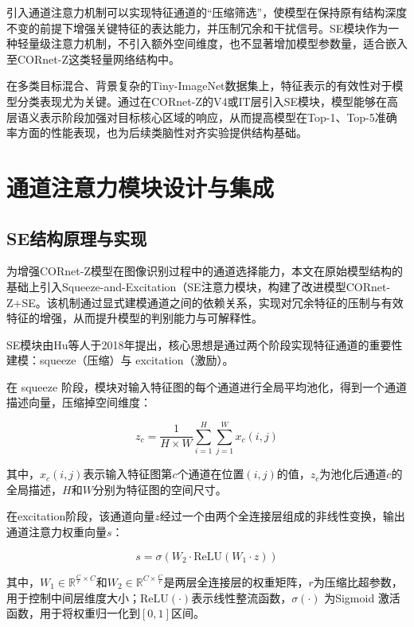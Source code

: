 引入通道注意力机制可以实现特征通道的“压缩筛选”，使模型在保持原有结构深度不变的前提下增强关键特征的表达能力，并压制冗余和干扰信号。SE模块作为一种轻量级注意力机制，不引入额外空间维度，也不显著增加模型参数量，适合嵌入至CORnet-Z这类轻量网络结构中。

在多类目标混合、背景复杂的Tiny-ImageNet数据集上，特征表示的有效性对于模型分类表现尤为关键。通过在CORnet-Z的V4或IT层引入SE模块，模型能够在高层语义表示阶段加强对目标核心区域的响应，从而提高模型在Top-1、Top-5准确率方面的性能表现，也为后续类脑性对齐实验提供结构基础。

\section{通道注意力模块设计与集成}

\subsection{SE结构原理与实现}

为增强CORnet-Z模型在图像识别过程中的通道选择能力，本文在原始模型结构的基础上引入Squeeze-and-Excitation（SE注意力模块，构建了改进模型CORnet-Z+SE。该机制通过显式建模通道之间的依赖关系，实现对冗余特征的压制与有效特征的增强，从而提升模型的判别能力与可解释性。

SE模块由Hu等人于2018年提出，核心思想是通过两个阶段实现特征通道的重要性建模：squeeze（压缩）与 excitation（激励）。

在 squeeze 阶段，模块对输入特征图的每个通道进行全局平均池化，得到一个通道描述向量，压缩掉空间维度：

\begin{equation}
	z_c = 
	\frac{1}{H \times W} 
	\sum_{i=1}^{H} \sum_{j=1}^{W} x_c(i, j)
	\label{eq:se_squeeze}
\end{equation}

其中，$x_c(i,j)$表示输入特征图第$c$个通道在位置$(i,j)$的值，$z_c$为池化后通道$c$的全局描述，$H$和$W$分别为特征图的空间尺寸。

在excitation阶段，该通道向量$z$经过一个由两个全连接层组成的非线性变换，输出通道注意力权重向量$s$：

\begin{equation}
	s = \sigma \left( W_2 \cdot \text{ReLU} \left( W_1 \cdot z \right) \right)
	\label{eq:se_excitation}
\end{equation}

其中，$W_1 \in \mathbb{R}^{\frac{C}{r} \times C}$和$W_2 \in \mathbb{R}^{C \times \frac{C}{r}}$是两层全连接层的权重矩阵，$r$为压缩比超参数，用于控制中间层维度大小；$\text{ReLU}(\cdot)$表示线性整流函数，$\sigma(\cdot)$ 为Sigmoid 激活函数，用于将权重归一化到$[0,1]$区间。

